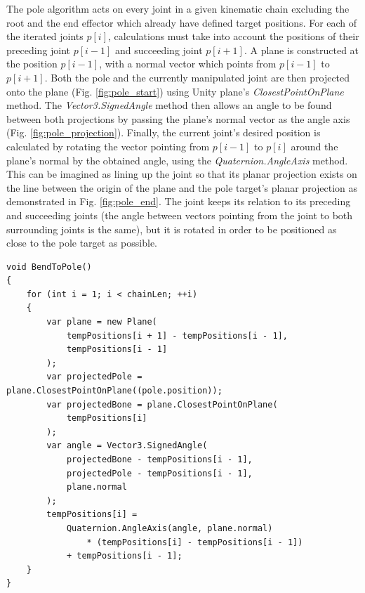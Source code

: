 The pole algorithm acts on every joint in a given kinematic chain excluding the
root and the end effector which already have defined target positions. For each
of the iterated joints \(p[i]\), calculations must take into account the
positions of their preceding joint \(p[i-1]\) and succeeding joint \(p[i+1]\).
A plane is constructed at the position \(p[i-1]\), with a normal vector which
points from \(p[i-1]\) to \(p[i+1]\). Both the pole and the currently
manipulated joint are then projected onto the plane (Fig.
\ref{fig:pole_start}) using Unity plane's \textit{ClosestPointOnPlane} method.
The \textit{Vector3.SignedAngle} method then allows an angle to be found between
both projections by passing the plane's normal vector as the angle axis (Fig.
\ref{fig:pole_projection}). Finally, the current joint's desired position is
calculated by rotating the vector pointing from \(p[i-1]\) to \(p[i]\) around
the plane's normal by the obtained angle, using the
\textit{Quaternion.AngleAxis} method. This can be imagined as lining up the
joint so that its planar projection exists on the line between the origin of the
plane and the pole target's planar projection as demonstrated in Fig.
\ref{fig:pole_end}. The joint keeps its relation to its preceding and succeeding
joints (the angle between vectors pointing from the joint to both surrounding
joints is the same), but it is rotated in order to be positioned as close to the
pole target as possible.

\begin{lstlisting}[basicstyle=\linespread{0.9}\footnotesize\ttfamily, numbers=none,frame=single,
caption={Pole target constraint. \textit{Fabrik.cs}},captionpos=t, label=poles, language={[Sharp]c},
float=tp]
void BendToPole()
{
    for (int i = 1; i < chainLen; ++i)
    {
        var plane = new Plane(
            tempPositions[i + 1] - tempPositions[i - 1],
            tempPositions[i - 1]
        );
        var projectedPole = plane.ClosestPointOnPlane((pole.position));
        var projectedBone = plane.ClosestPointOnPlane(
            tempPositions[i]
        );
        var angle = Vector3.SignedAngle(
            projectedBone - tempPositions[i - 1],
            projectedPole - tempPositions[i - 1],
            plane.normal
        );
        tempPositions[i] =
            Quaternion.AngleAxis(angle, plane.normal)
                * (tempPositions[i] - tempPositions[i - 1])
            + tempPositions[i - 1];
    }
}
\end{lstlisting}



